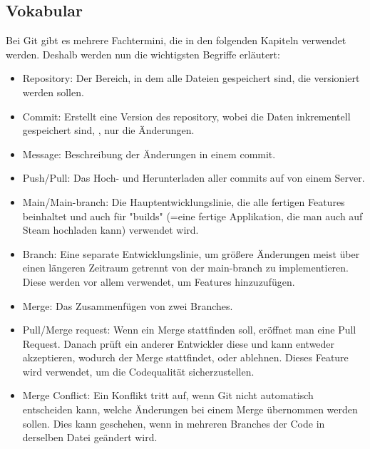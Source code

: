 \renewcommand{\kapitelautor}{Autor: Felix Zwickelstorfer}
\subsection{Vokabular}\label{subsec:git-vokabular}


\renewcommand{\kapitelautor}{Autor: Felix Zwickelstorfer}

Bei Git gibt es mehrere Fachtermini, die in den folgenden Kapiteln verwendet werden.
Deshalb werden nun die wichtigsten Begriffe erläutert:

\begin{itemize}
    \item Repository: Der Bereich, in dem alle Dateien gespeichert sind, die versioniert werden sollen.
    \item Commit: Erstellt eine Version des repository, wobei die Daten inkrementell gespeichert sind, \dah, nur die Änderungen.
    \item Message: Beschreibung der Änderungen in einem commit.
    \item Push/Pull: Das Hoch- und Herunterladen aller commits auf \bzw von einem Server.
    \item Main/Main-branch: Die Hauptentwicklungslinie, die alle fertigen Features beinhaltet und auch für "builds" (=eine fertige Applikation, die man auch auf Steam hochladen kann) verwendet wird.
    \item Branch: Eine separate Entwicklungslinie, um größere Änderungen meist über einen längeren Zeitraum getrennt von der main-branch zu implementieren.
    Diese werden vor allem verwendet, um Features hinzuzufügen.
    \item Merge: Das Zusammenfügen von zwei Branches.
    \item Pull/Merge request: Wenn ein Merge stattfinden soll, eröffnet man eine Pull Request.
    Danach prüft ein anderer Entwickler diese und kann entweder akzeptieren, wodurch der Merge stattfindet, oder ablehnen.
    Dieses Feature wird verwendet, um die Codequalität sicherzustellen.
    \item Merge Conflict: Ein Konflikt tritt auf, wenn Git nicht automatisch entscheiden kann, welche Änderungen bei einem Merge übernommen werden sollen.
    Dies kann geschehen, wenn in mehreren Branches der Code in derselben Datei geändert wird.\cite{gitHomePage}
\end{itemize}
